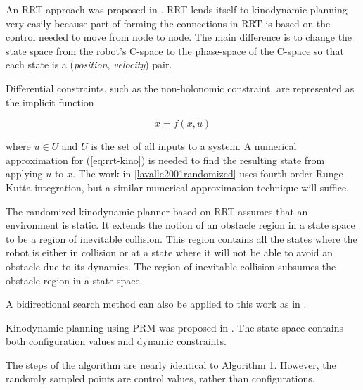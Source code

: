 An RRT approach was proposed in \cite{lavalle2001randomized}. RRT lends itself to kinodynamic planning very easily because part of forming the connections in RRT is based on the control needed to move from node to node. The main difference is to change the state space from the robot's C-space to the phase-space of the C-space so that each state is a (\emph{position}, \emph{velocity}) pair.

Differential constraints, such as the non-holonomic constraint, are represented as the implicit function

\begin{equation}
\label{eq:rrt-kino} \dot{x} = f(x,u)
\end{equation}

where $u \in U$ and $U$ is the set of all inputs to a system. A numerical approximation for (\ref{eq:rrt-kino}) is needed to find the resulting state from applying $u$ to $x$. The work in \ref{lavalle2001randomized} uses fourth-order Runge-Kutta integration, but a similar numerical approximation technique will suffice.

The randomized kinodynamic planner based on RRT assumes that an environment is static. It extends the notion of an obstacle region in a state space to be a region of inevitable collision. This region contains all the states where the robot is either in collision or at a state where it will not be able to avoid an obstacle due to its dynamics. The region of inevitable collision subsumes the obstacle region in a state space.

A bidirectional search method can also be applied to this work as in \cite{kuffner2000rrt}.

















Kinodynamic planning using PRM was proposed in \cite{hsu2002randomized}. The state space contains both configuration values and dynamic constraints.

The steps of the algorithm are nearly identical to Algorithm 1. However, the randomly sampled points are control values, rather than configurations.

